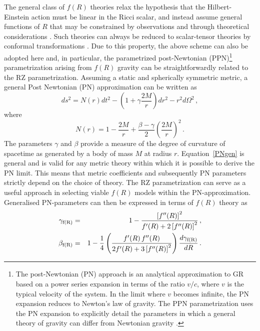 \documentclass[a4paper,aps,twocolumn,showpacs,showkeys,nofootinbib,preprintnumbers,superscriptaddress,amsmath,amssymb,amsfonts]{revtex4-1}
\begin{document}
The general class of $f(R)$ theories relax the hypothesis that the
Hilbert-Einstein action must be linear in the Ricci scalar, and
instead assume general functions of $R$ that may be constrained by
observations and through theoretical considerations
\cite{Capozziello2008}. Such theories can always be reduced to
scalar-tensor theories by conformal transformations
\cite{Capozziello2011}. Due to this property, the above scheme can also be
adopted here and, in particular, the parametrized post-Newtonian
(PPN)\footnote{The post-Newtonian (PN) approach is an analytical
  approximation to GR based on a power series expansion in terms
  of the ratio $v/c$, where $v$ is the typical velocity of the system. In
  the limit where $v$ becomes infinite, the PN expansion reduces to
  Newton's law of gravity. The PPN parametrization uses the PN expansion
  to explicitly detail the parameters in which a general theory of
  gravity can differ from Newtonian gravity \cite{Will92}.}
parametrization arising from $f(R)$ gravity can be straightforwardly
related to the RZ parametrization. Assuming a static and
spherically symmetric metric, a general Post Newtonian (PN) approximation
can be written as \cite{Eddington1923}
%
\begin{equation}
\label{PNgen}
ds^2= N\left( r \right)dt^2 - \left( 1+\gamma\frac{2M}{r} \right) dr^2 -
r^2 d\Omega^2 \,,
\end{equation}
%
where
%
\begin{equation}
N\left( r \right) = 1-\frac{2M}{r}+\frac{\beta-\gamma}{2} \left( \frac{2M}{r}\right)^2 \,.
\end{equation}
The parameters $\gamma$ and $\beta$ provide a measure of the degree of
curvature of spacetime as generated by a body of mass $M$ at radius
$r$. Equation~\eqref{PNgen} is general and is valid for any metric theory
within which it is possible to derive the PN limit. This means that
metric coefficients and subsequently PN parameters strictly depend on the
choice of theory. The RZ parametrization can serve as a useful approach
in selecting viable $f(R)$ models within the PN-approximation.
Generalised PN-parameters can then be expressed in terms of $f(R)$
theory as \cite{Capozziello2005, Capozziello2006, Capozziello2009}
%
\begin{eqnarray}
\gamma_{\rm f(R)}  &=& 1 - \frac{\left[f''(R)\right]^2}{f'(R)+2\left[f''(R)\right]^2} \,, \label{gammaR} \\
\beta_{\rm f(R)} &=& 1 - \frac{1}{4} \left( \frac{f'(R)\, f''(R)}{2 f'(R)+3\left[f''(R)\right]^2} \right)
\frac{d\gamma_{\rm f(R)}}{dR} \,. \label{betaR}
\end{eqnarray}
\end{document}

